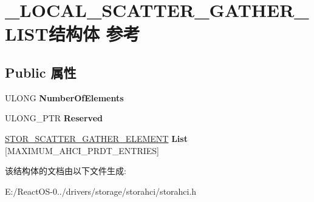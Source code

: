 \hypertarget{struct___l_o_c_a_l___s_c_a_t_t_e_r___g_a_t_h_e_r___l_i_s_t}{}\section{\+\_\+\+L\+O\+C\+A\+L\+\_\+\+S\+C\+A\+T\+T\+E\+R\+\_\+\+G\+A\+T\+H\+E\+R\+\_\+\+L\+I\+S\+T结构体 参考}
\label{struct___l_o_c_a_l___s_c_a_t_t_e_r___g_a_t_h_e_r___l_i_s_t}
\subsection*{Public 属性}
\begin{DoxyCompactItemize}
\item 
\mbox{\label{struct___l_o_c_a_l___s_c_a_t_t_e_r___g_a_t_h_e_r___l_i_s_t_a7c67b4717a4e1c2b038d0724a501df3b}} 
U\+L\+O\+NG {\bfseries Number\+Of\+Elements}
\item 
\mbox{\label{struct___l_o_c_a_l___s_c_a_t_t_e_r___g_a_t_h_e_r___l_i_s_t_a787457ec9c7febc75e48a99b828578a4}} 
U\+L\+O\+N\+G\+\_\+\+P\+TR {\bfseries Reserved}
\item 
\mbox{\label{struct___l_o_c_a_l___s_c_a_t_t_e_r___g_a_t_h_e_r___l_i_s_t_a299a8e9f8a9e09c7b8dba0089fd5876f}} 
\hyperlink{struct___s_t_o_r___s_c_a_t_t_e_r___g_a_t_h_e_r___e_l_e_m_e_n_t}{S\+T\+O\+R\+\_\+\+S\+C\+A\+T\+T\+E\+R\+\_\+\+G\+A\+T\+H\+E\+R\+\_\+\+E\+L\+E\+M\+E\+NT} {\bfseries List} \mbox{[}M\+A\+X\+I\+M\+U\+M\+\_\+\+A\+H\+C\+I\+\_\+\+P\+R\+D\+T\+\_\+\+E\+N\+T\+R\+I\+ES\mbox{]}
\end{DoxyCompactItemize}


该结构体的文档由以下文件生成\+:\begin{DoxyCompactItemize}
\item 
E\+:/\+React\+O\+S-\/0../drivers/storage/storahci/storahci.\+h\end{DoxyCompactItemize}
